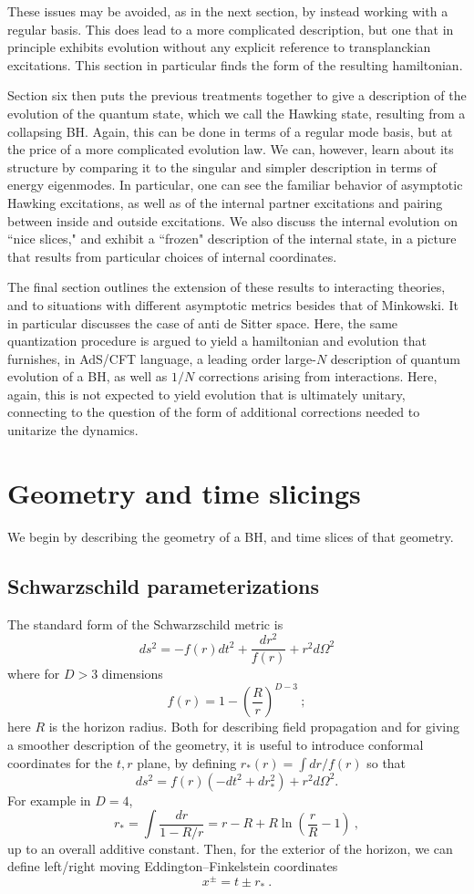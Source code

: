 \documentclass[11pt]{article}
\numberwithin{equation}{section}
\newcommand{\beq}{\begin{equation}}
\newcommand{\eeq}{\end{equation}}
\begin{document}
These issues may be avoided, as in the next section, by  instead working with a regular basis.  This does lead to a more complicated description, but one that in principle exhibits evolution without any explicit reference to transplanckian excitations.  This section in particular finds the form of the resulting hamiltonian.  

Section six then puts the previous treatments together to give a description of the evolution of the quantum state, which we call the Hawking state, resulting from a collapsing BH. Again, this can be done in terms of a regular mode basis, but at the price of a more complicated evolution law.  We can, however, learn about its structure by comparing it to the singular and simpler description in terms of energy eigenmodes.  In particular, one can see the familiar behavior of asymptotic Hawking excitations, as well as of the internal partner excitations and pairing between inside and outside excitations.  We also discuss the internal evolution on ``nice slices," and exhibit a ``frozen" description of the internal state, in a picture that results from particular choices of internal coordinates.  

The final section outlines the extension of these results to interacting theories, and to situations with different asymptotic metrics besides that of Minkowski.  It in particular discusses the case of anti de Sitter space.  Here, the same quantization procedure is argued to yield a hamiltonian and evolution that furnishes, in AdS/CFT language, a leading order large-$N$ description of quantum evolution of a BH, as well as $1/N$ corrections arising from interactions.  Here, again, this is not expected to yield evolution that is ultimately unitary, connecting to the question of the form of additional corrections needed to unitarize the dynamics.



\section{Geometry and time slicings}\label{Slicing}

We begin by describing the geometry of a BH, and time slices of that geometry.

\subsection{Schwarzschild parameterizations} 
The standard form of the Schwarzschild metric is
\beq
\label{Schmet}
ds^2 = -f(r) dt^2 + \frac{dr^2}{f(r)} + r^2 d\Omega^2
\eeq
where for $D>3$ dimensions
\beq
f(r) = 1-\left(\frac{R}{r}\right)^{D-3}\ ;
\eeq
here $R$ is the horizon radius.  Both for describing field propagation and for giving a smoother description of the geometry, it
 is useful to introduce conformal coordinates for the $t,r$ plane, by defining $r_*(r) = \int dr/{f(r)}$ so that
\beq
\label{rstarmet}
ds^2 = f(r)(- dt^2 +dr_*^2) + r^2 d\Omega^2.
\eeq
For example in $D=4$, 
\beq
r_* = \int \frac{dr}{1-R/r} = r-R+R\ln\left(\frac{r}{R}-1\right)\ ,
\eeq
up to an overall additive constant.  
Then, for the exterior of the horizon, we can define left/right moving Eddington--Finkelstein coordinates 
\beq\label{xpdef}
x^\pm = t\pm r_*\ .
\eeq
\end{document}
